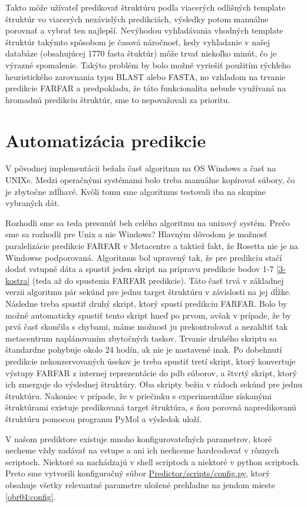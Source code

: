 \indent Takto môže užívateľ predikovať štruktúru podľa viacerých odlišných template štruktúr vo viacerých nezávislých predikciách, výsledky potom manuálne porovnať a vybrať ten najlepší. Nevýhodou vyhľadávania vhodných template štruktúr takýmto spôsobom je časová náročnosť, kedy vyhľadanie v našej databáze (obsahujúcej 1770 fasta štuktúr) môže trvať niekoľko minút, čo je výrazné spomalenie. Takýto problém by bolo možné vyriešiť použitím rýchleho heuristického zarovnania typu BLAST alebo FASTA, no vzhľadom na trvanie predikcie FARFAR a predpokladu, že táto funkcionalita nebude využívaná na hromadnú predikciu štruktúr, sme to nepovažovali za prioritu.


\section{Automatizácia predikcie}
V pôvodnej implementácii bežala časť algoritmu na OS Windows a časť na UNIXe. Medzi operačnými systémami bolo treba manuálne kopírovať súbory, čo je zbytočne zdĺhavé. Kvôli tomu sme algoritmus testovali iba na skupine vybraných dát. 

\indent Rozhodli sme sa teda presunúť beh celého algoritmu na unixový systém. Prečo sme sa rozhodli pre Unix a nie Windows? Hlavným dôvodom je možnosť paralelizácie predikcie FARFAR v Metacentre a taktiež fakt, že Rosetta nie je na Windowse podporovaná. Algoritmus bol upravený tak, že pre predikciu stačí dodať vstupné dáta a spustiť jeden skript na prípravu predikcie bodov 1-7 \ref{3-kostra} (teda až do spustenia FARFAR predikcie). Táto časť trvá v základnej verzii algoritmu pár sekúnd pre jednu target štruktúru v závislosti na jej dĺžke.  Následne treba spustiť druhý skript, ktorý spustí predikciu FARFAR. Bolo by možné automaticky spustiť tento skript hneď po prvom, avšak v prípade, že by prvá časť skončila s chybami, máme možnosť ju prekontrolovať a nezahltiť tak metacentrum naplánovaním zbytočných taskov. Trvanie druhého skriptu sa štandardne pohybuje okolo 24 hodín, ak nie je nastavené inak. Po dobehnutí predikcie nekonzervovaných úsekov je treba spustiť tretí skript, ktorý konvertuje výstupy FARFAR z internej reprezentácie do pdb súborov, a štvrtý skript, ktorý ich zmerguje do výslednej štruktúry. Oba skripty bežia v rádoch sekúnd pre jednu štruktúru. Nakoniec v prípade, že v priečinku s experimentálne získanými štruktúrami existuje predikovaná target štruktúra, s ňou porovná napredikovanú štruktúru pomocou programu PyMol a výsledok uloží.


\indent V našom prediktore existuje mnoho konfigurovateľných parametrov, ktoré necheme vždy zadávať na vstupe a ani ich nechceme hardcodovať v rôznych scriptoch. Niektoré sa nachádzajú v shell scriptoch a niektoré v python scriptoch. Preto sme vytvorili konfiguračný súbor \url{Predictor/scripts/config.py}, ktorý obsahuje všetky relevantné parametre uložené prehľadne na jendom mieste \ref{obr04:config}.

